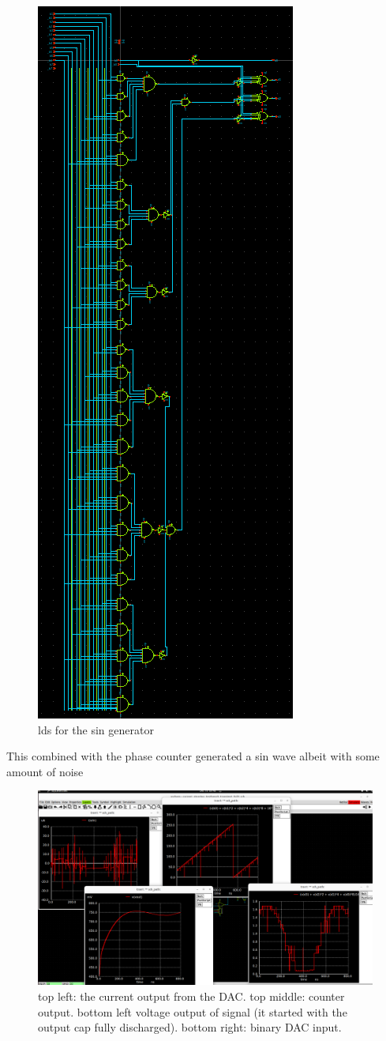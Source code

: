 \documentclass{article}
\begin{document}
\begin{figure}
    \centering
    \includegraphics[width=0.5\linewidth]{images/sin_generator_combinational_logic.png}
    \caption{lds for the sin generator}
    \label{fig:lds_sin}
\end{figure}

This combined with the phase counter generated a sin wave albeit with some amount of noise 
\begin{figure}
    \centering
    \includegraphics[width=0.8\linewidth]{images/preliminary_combinational_logic_results.png}
    \caption{top left: the current output from the DAC. top middle: counter output. bottom left voltage output of signal (it started with the output cap fully discharged). bottom right: binary DAC input.}
    \label{fig:lds_sin}
\end{figure}
\end{document}

